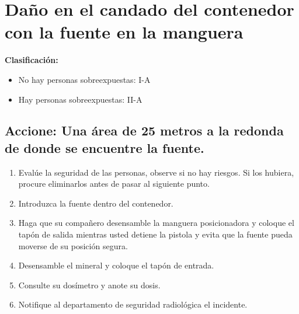 \section{Daño en el candado del contenedor con la fuente en la manguera}

\textbf{Clasificación:}
\begin{itemize}
  \item No hay personas sobreexpuestas: I-A
  \item Hay personas sobreexpuestas: II-A
\end{itemize}

\subsection{Accione: Una área de 25 metros a la redonda de donde se encuentre la fuente.}
\begin{enumerate}
    \item Evalúe la seguridad de las personas, observe si no hay riesgos. Si los hubiera, procure eliminarlos antes de pasar al siguiente punto.
    \item Introduzca la fuente dentro del contenedor.
    \item Haga que su compañero desensamble la manguera posicionadora y coloque el tapón de salida mientras usted detiene la pistola y evita que la fuente pueda moverse de su posición segura.
    \item Desensamble el mineral y coloque el tapón de entrada.
    \item Consulte su dosímetro y anote su dosis.
    \item Notifique al departamento de seguridad radiológica el incidente.
\end{enumerate}

